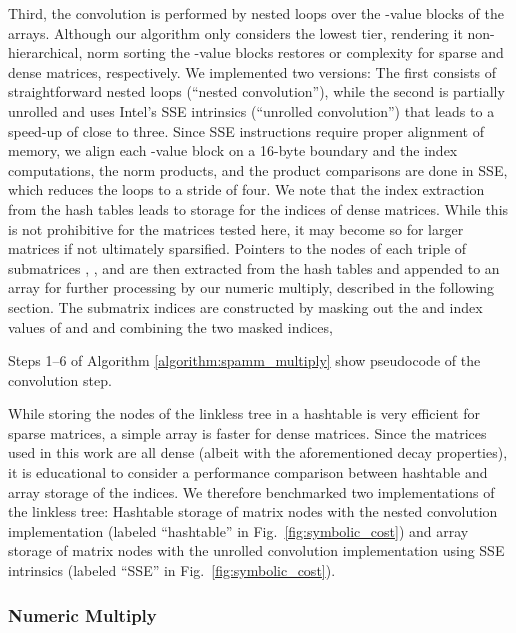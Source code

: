 \noindent Third, the convolution is performed by nested loops over the
-value blocks of the arrays. Although our algorithm only considers the
lowest tier, rendering it non-hierarchical, norm sorting the -value blocks
restores  or  complexity for sparse and dense matrices, respectively.
We implemented two versions: The first consists of straightforward nested
loops (``nested convolution''), while the second is partially unrolled and
uses Intel's SSE intrinsics (``unrolled convolution'') that leads to a
speed-up of close to three. Since SSE instructions require proper alignment of
memory, we align each -value block on a 16-byte boundary and the index
computations, the norm products, and the product comparisons are done in SSE,
which reduces the loops to a stride of four. We note that the index extraction
from the hash tables leads to  storage for
the indices of dense matrices.  While this is not prohibitive for the matrices
tested here, it may become so for larger matrices if not ultimately
sparsified.  Pointers to the nodes of each triple of submatrices ,
, and  are then extracted from the hash tables and appended to
an array for further processing by our numeric multiply, described in the
following section. The  submatrix indices are constructed by masking
out the  and  index values of  and  and combining
the two masked indices,

Steps 1--6 of Algorithm \ref{algorithm:spamm_multiply} show pseudocode of the
convolution step.

While storing the nodes of the linkless tree in a hashtable is very efficient
for sparse matrices, a simple array is faster for dense matrices. Since the
matrices used in this work are all dense (albeit with the aforementioned decay
properties), it is educational to consider a performance comparison between
hashtable and array storage of the indices. We therefore benchmarked two
implementations of the linkless tree: Hashtable storage of matrix nodes with
the nested convolution implementation (labeled ``hashtable'' in
Fig.~\ref{fig:symbolic_cost}) and array storage of matrix nodes with the
unrolled convolution implementation using SSE intrinsics (labeled ``SSE'' in
Fig.~\ref{fig:symbolic_cost}).

\subsubsection{Numeric Multiply}
\label{sec:fast_kernel}

